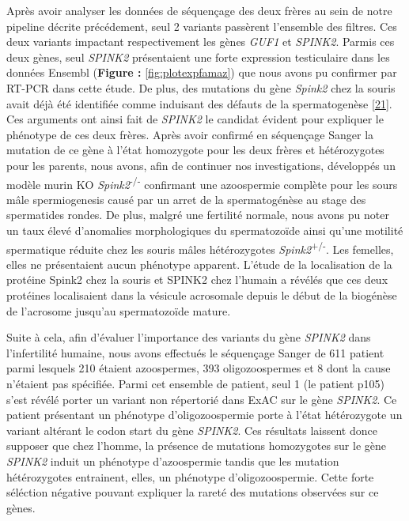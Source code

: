 \documentclass[12pt,twoside]{ugathesis}
\begin{document}
Après avoir analyser les données de séquençage des deux frères au sein
de notre pipeline décrite précédement, seul 2 variants passèrent
l'ensemble des filtres. Ces deux variants impactant respectivement les
gènes \emph{GUF1} et \emph{SPINK2}. Parmis ces deux gènes, seul
\emph{SPINK2} présentaient une forte expression testiculaire dans les
données Ensembl (\textbf{Figure : }\ref{fig:plotexpfamaz}) que nous
avons pu confirmer par RT-PCR dans cette étude. De plus, des mutations
du gène \emph{Spink2} chez la souris avait déjà été identifiée comme
induisant des défauts de la spermatogenèse
{[}\protect\hyperlink{ref-Lee2011}{21}{]}. Ces arguments ont ainsi fait
de \emph{SPINK2} le candidat évident pour expliquer le phénotype de ces
deux frères. Après avoir confirmé en séquençage Sanger la mutation de ce
gène à l'état homozygote pour les deux frères et hétérozygotes pour les
parents, nous avons, afin de continuer nos investigations, développés un
modèle murin KO \emph{Spink2}\textsuperscript{-/-} confirmant une
azoospermie complète pour les sours mâle spermiogenesis causé par un
arret de la spermatogénèse au stage des spermatides rondes. De plus,
malgré une fertilité normale, nous avons pu noter un taux élevé
d'anomalies morphologiques du spermatozoïde ainsi qu'une motilité
spermatique réduite chez les souris mâles hétérozygotes
\emph{Spink2}\textsuperscript{+/-}. Les femelles, elles ne présentaient
aucun phénotype apparent. L'étude de la localisation de la protéine
Spink2 chez la souris et SPINK2 chez l'humain a révélés que ces deux
protéines localisaient dans la vésicule acrosomale depuis le début de la
biogénèse de l'acrosome jusqu'au spermatozoïde mature.

Suite à cela, afin d'évaluer l'importance des variants du gène
\emph{SPINK2} dans l'infertilité humaine, nous avons effectués le
séquençage Sanger de 611 patient parmi lesquels 210 étaient azoospermes,
393 oligozoospermes et 8 dont la cause n'étaient pas spécifiée. Parmi
cet ensemble de patient, seul 1 (le patient p105) s'est révélé porter un
variant non répertorié dans ExAC sur le gène \emph{SPINK2}. Ce patient
présentant un phénotype d'oligozoospermie porte à l'état hétérozygote un
variant altérant le codon start du gène \emph{SPINK2}. Ces résultats
laissent donce supposer que chez l'homme, la présence de mutations
homozygotes sur le gène \emph{SPINK2} induit un phénotype d'azoospermie
tandis que les mutation hétérozygotes entrainent, elles, un phénotype
d'oligozoospermie. Cette forte séléction négative pouvant expliquer la
rareté des mutations observées sur ce gènes.
\end{document}

